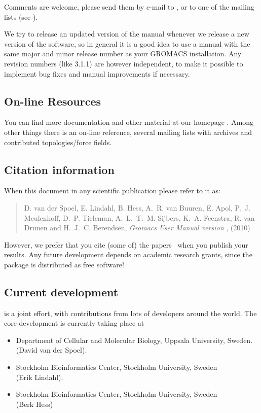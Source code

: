 \documentclass[11pt,a4paper,twoside]{gmxmanual}
\begin{document}
{Comments are welcome, please send them by e-mail to {\email}, or to
one of the mailing lists (see \wwwpage).

We try to release an updated version of the manual whenever
we release a new version of the software, so in general 
it is a good idea to use a manual with the same major and
minor release number as your GROMACS installation. 
Any revision numbers (like 3.1.1) are however independent, 
to make it possible to implement bug fixes and manual
improvements if necessary. 

\subsection*{On-line Resources}
You can find more documentation and other material at our homepage
\wwwpage. Among other things there is an on-line reference, several
{\gromacs} mailing lists with archives and contributed
topologies/force fields.

\subsection*{Citation information}
When  this document in any scientific publication
please refer to it as:
\begin{quote}
\raggedright
D. van der Spoel, E. Lindahl, B. Hess, A.~R. van Buuren, E. Apol, P.~J. Meulenhoff, D.~P. Tieleman, A.~L.~T.~M. Sij\-bers, K.~A. Feenstra, 
R. van Drunen and H.~J.~C. Berendsen,
\hspace{0.3em} {\em Gromacs {U}ser {M}anual version \gmxver},
\hspace{0.3em} {\wwwpage} (2010)
\end{quote}
However, we prefer that you cite (some of) the {\gromacs}
papers~\cite{Bekker93a,Berendsen95a,Lindahl2001a,Spoel2005a,Hess2008b} when you publish
your results. Any future development depends on academic research
grants, since the package is distributed as free software!

\subsection*{Current development}
{\gromacs} is a joint effort, with contributions from lots of developers around
the world. The core development is currently taking place at
\begin{itemize}
\item Department of Cellular and Molecular Biology, Uppsala University, Sweden.\\ 
(David van der Spoel).
\item Stockholm Bioinformatics Center, Stockholm University, Sweden \\
(Erik Lindahl).
\item Stockholm Bioinformatics Center, Stockholm University, Sweden \\
(Berk Hess)
\end{itemize}

}
\end{document}
